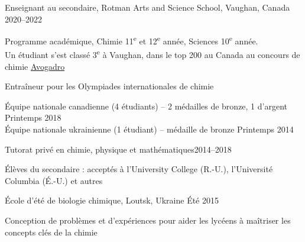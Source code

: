 \documentclass[margin,line]{res}
\newenvironment{list1}{
 \begin{list}{\ding{113}}{%
  \setlength{\itemsep}{0in}
  \setlength{\parsep}{0in} \setlength{\parskip}{0in}
  \setlength{\topsep}{0in} \setlength{\partopsep}{0in} 
  \setlength{\leftmargin}{0.17in}}}{\end{list}}
\begin{document}
\begin{resume}
\vspace{-0.3cm}

Enseignant au secondaire, Rotman Arts and Science School, Vaughan, Canada \hfill{2020--2022}

\begin{list1}

\item[] Programme académique, Chimie 11\textsuperscript{e} et 12\textsuperscript{e} année, Sciences 10\textsuperscript{e} année. \\
Un étudiant s'est classé 3\textsuperscript{e} à Vaughan, dans le top 200 au Canada au concours de chimie \href{https://uwaterloo.ca/chemistry/community-outreach/chemistry-high-school-exams}{Avogadro}
\end{list1}

\vspace{-0.3cm}

Entraîneur pour les Olympiades internationales de chimie
\begin{list1}
\item[]Équipe nationale canadienne (4 étudiants) -- 2 médailles de bronze, 1 d'argent \hfill{Printemps 2018}\\
Équipe nationale ukrainienne (1 étudiant) -- médaille de bronze \hfill{Printemps 2014}
\end{list1}

\vspace{-0.3cm}

Tutorat privé en chimie, physique et mathématiques\hfill{2014--2018}

\begin{list1}
\item[]Élèves du secondaire : acceptés à l'University College (R.-U.), l'Université Columbia (É.-U.) et autres
\end{list1}

\vspace{-0.3cm}

École d'été de biologie chimique, Loutsk, Ukraine \hfill{Été 2015}

\begin{list1}
\item[]
Conception de problèmes et d'expériences pour aider les lycéens à maîtriser les concepts clés de la chimie
\end{list1}


\end{resume}
\end{document}

